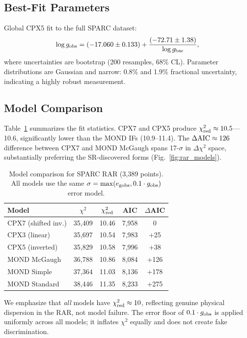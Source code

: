 \documentclass[twocolumn]{aastex631}
\begin{document}
\subsection{Best-Fit Parameters}

Global CPX5 fit to the full SPARC dataset:
\[
\log g_{\rm obs} = (-17.060 \pm 0.133) + \frac{(-72.71 \pm 1.38)}{\log g_{\rm bar}},
\]
where uncertainties are bootstrap (200 resamples, 68\% CL).  Parameter
distributions are Gaussian and narrow: 0.8\% and 1.9\% fractional
uncertainty, indicating a highly robust measurement.

\subsection{Model Comparison}

Table~\ref{tab:models} summarizes the fit statistics.  CPX7 and CPX5
produce $\chi^2_{\rm red} \approx 10.5$---10.6, significantly lower than
the MOND IFs (10.9--11.4).  The $\Delta{\rm AIC} \approx 126$ difference
between CPX7 and MOND McGaugh spans 17-$\sigma$ in $\Delta\chi^2$ space,
substantially preferring the SR-discovered forms (Fig.~\ref{fig:rar_models}).

\begin{table}
\centering
\caption{Model comparison for SPARC RAR (3,389 points). All models use the
same $\sigma = \max(e_{\rm gobs}, 0.1\cdot g_{\rm obs})$ error model.}
\begin{tabular}{lcccc}
\hline
Model & $\chi^2$ & $\chi^2_{\rm red}$ & AIC & $\Delta$AIC \\
\hline
CPX7 (shifted inv.) & 35,409 & 10.46 &  7,958 &      0 \\
CPX3 (linear)       & 35,697 & 10.54 &  7,983 &   +25 \\
CPX5 (inverted)     & 35,829 & 10.58 &  7,996 &   +38 \\
MOND McGaugh        & 36,788 & 10.86 &  8,084 &  +126 \\
MOND Simple         & 37,364 & 11.03 &  8,136 &  +178 \\
MOND Standard       & 38,446 & 11.35 &  8,233 &  +275 \\
\hline
\end{tabular}
\label{tab:models}
\end{table}

We emphasize that \emph{all} models have $\chi^2_{\rm red} \approx 10$,
reflecting genuine physical dispersion in the RAR, not model failure.
The error floor of $0.1\cdot g_{\rm obs}$ is applied uniformly across
all models; it inflates $\chi^2$ equally and does not create fake
discrimination.
\end{document}

